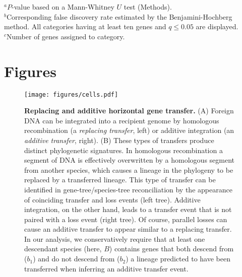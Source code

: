 \documentclass[12pt]{article}
\begin{document}
\begin{table}[!h]
\begin{centering}
\begin{tabular}{ccccl}
\hline 
\end{tabular}
\par\end{centering}
\begin{flushleft}
$^a$$P$-value based on a Mann-Whitney $U$ test (Methods).\\
$^b$Corresponding false discovery rate estimated by the
Benjamini-Hochberg method.  All categories having at least ten genes and
$q\leq 0.05$ are displayed.\\ 
$^c$Number of genes assigned to category.\\
\end{flushleft}
\label{tab:go-events}
\end{table}
\clearpage{}


\section*{Figures}

\begin{figure}[!h]
\begin{center}
\texttt{[image: figures/cells.pdf]}
\end{center}
\caption{ {\bf Replacing and additive horizontal gene transfer.}  (A)
  Foreign DNA can be integrated into a recipient genome by homologous
  recombination (a {\em replacing transfer}, left) or additive integration
  (an {\em additive transfer}, right). (B) These types of transfers produce
  distinct phylogenetic signatures.  In homologous recombination a segment
  of DNA is effectively overwritten by a homologous segment from another
  species, which causes a lineage in the phylogeny to be replaced by a
  transferred lineage.  This type of transfer can be identified in
  gene-tree/species-tree reconciliation by the appearance of coinciding
  transfer and loss events (left tree).  Additive integration, on the other
  hand, leads to a transfer event that is not paired with a loss event
  (right tree).  Of course, parallel losses can cause an additive transfer
  to appear similar to a replacing transfer.  In our analysis, we
  conservatively require that at least one descendant species (here, 
    $B$) contains genes that both descend from ($b_1$) and do not descend
  from ($b_2$) a lineage predicted to have been transferred when
  inferring an additive transfer event.}
\label{fig:hgt}
\end{figure}
\clearpage{}%
\end{document}
